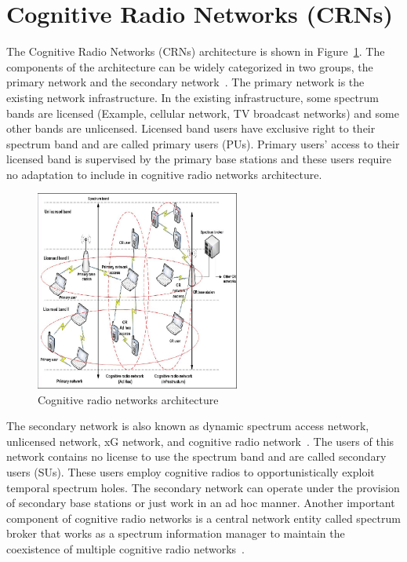 \section{Cognitive Radio Networks (CRNs)}

The Cognitive Radio Networks (CRNs) architecture is shown in Figure~\ref{fig:cogArch}. The components of the architecture can be widely categorized in two groups, the primary network and the secondary network~\cite{akyildiz2006next}. The primary network is the existing network infrastructure. In the existing infrastructure, some spectrum bands are licensed (Example, cellular network, TV broadcast networks) and some other bands are unlicensed. Licensed band users have exclusive right to their spectrum band and are called primary users (PUs). Primary users' access to their licensed band is supervised by the primary base stations and these users require no adaptation to include in cognitive radio networks architecture. 

\begin{figure}[!htbp]
    \begin{center}
        \includegraphics[width=0.6\textwidth]{myFigures/cogArch.png}
        \caption{Cognitive radio networks architecture~\cite{bwnGatechProjectDescription}}
        \label{fig:cogArch}
    \end{center}
\end{figure}

The secondary network is also known as dynamic spectrum access network, unlicensed network, xG network, and cognitive radio network~\cite{akyildiz2006next}. The users of this network contains no license to use the spectrum band and are called secondary users (SUs). These users employ cognitive radios to opportunistically exploit temporal spectrum holes. The secondary network can operate under the provision of secondary base stations or just work in an ad hoc manner. Another important component of cognitive radio networks is a central network entity called spectrum broker that works as a spectrum information manager to maintain the coexistence of multiple cognitive radio networks~\cite{akyildiz2006next, buddhikot2005dimsumnet, ileri2005demand, zekavat2005user}.

